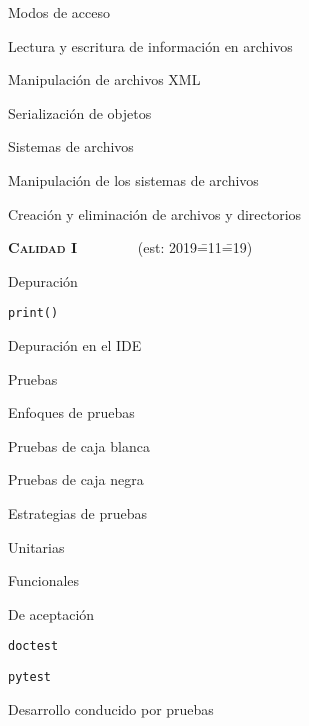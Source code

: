 \begin{longenum}
\begin{longenum}
\begin{longenum}
            \item Modos de acceso
            \item Lectura y escritura de información en archivos
        \end{longenum}
        \item Manipulación de archivos XML
        \item Serialización de objetos
        \item Sistemas de archivos
        \begin{longenum}
            \item Manipulación de los sistemas de archivos
            \item Creación y eliminación de archivos y directorios
        \end{longenum}
    \end{longenum}
    \item \textbf{\textsc{Calidad I}} \ \ \ \ \ \ \ \ (est: 2019\==11\==19)
    \begin{longenum}
        \item Depuración
        \begin{longenum}
            \item \texttt{print()}
            \item Depuración en el IDE
        \end{longenum}
        \item Pruebas
        \begin{longenum}
            \item Enfoques de pruebas
            \begin{longenum}
                \item Pruebas de caja blanca
                \item Pruebas de caja negra
            \end{longenum}
            \item Estrategias de pruebas
            \begin{longenum}
                \item Unitarias
                \item Funcionales
                \item De aceptación
            \end{longenum}
            \item \texttt{doctest}
            \item \texttt{pytest}
            \item Desarrollo conducido por pruebas

\end{longenum}
\end{longenum}
\end{longenum}
